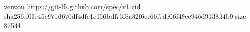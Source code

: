 version https://git-lfs.github.com/spec/v1
oid sha256:f00e45c971d670df4dfc1c156bdf73f8a82f6ce66f7de06f49cc946d9138d4b9
size 87544
